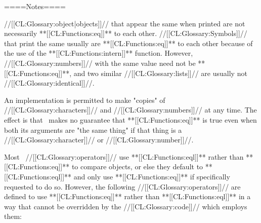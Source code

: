 ====Notes====

//[[CL:Glossary:object|objects]]// that appear the same when printed are not necessarily **[[CL:Functions:eq]]** to each other. //[[CL:Glossary:Symbols]]// that print the same usually are **[[CL:Functions:eq]]** to each other because of the use of the **[[CL:Functions:intern]]** function. However, //[[CL:Glossary:numbers]]// with the same value need not be **[[CL:Functions:eq]]**, and two similar //[[CL:Glossary:lists]]// are usually not //[[CL:Glossary:identical]]//.

An implementation is permitted to make "copies" of //[[CL:Glossary:characters]]// and //[[CL:Glossary:numbers]]// at any time. The effect is that \clisp\ makes no guarantee that **[[CL:Functions:eq]]** is true even when both its arguments are "the same thing" if that thing is a //[[CL:Glossary:character]]// or //[[CL:Glossary:number]]//.

Most \clisp\ //[[CL:Glossary:operators]]// use **[[CL:Functions:eql]]** rather than **[[CL:Functions:eq]]** to compare objects, or else they default to **[[CL:Functions:eql]]** and only use **[[CL:Functions:eq]]** if specifically requested to do so. However, the following //[[CL:Glossary:operators]]// are defined to use **[[CL:Functions:eq]]** rather than **[[CL:Functions:eql]]** in a way that cannot be overridden by the //[[CL:Glossary:code]]// which employs them:


